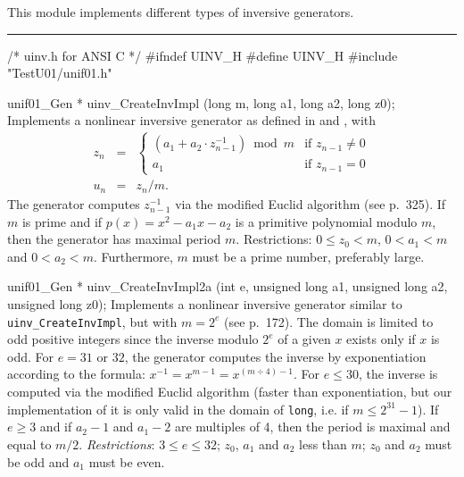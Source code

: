 
This module implements different types of inversive generators.

\bigskip
\hrule
\code
\hide
/* uinv.h for ANSI C */
#ifndef UINV_H
#define UINV_H
\endhide
#include "TestU01/unif01.h"


unif01_Gen * uinv_CreateInvImpl (long m, long a1, long a2, long z0);
\endcode
  \tab Implements a nonlinear inversive generator as 
   defined in \cite{rEIC92c} and \cite[p.93]{rLEC90a}, with
  \begin{eqnarray*}
         z_n &=& \left\{ \begin{array}{ll}
      (a_1 + a_2\cdot z_{n-1}^{-1})\bmod m & \mbox{if $z_{n-1}\not=0$}\\[6pt] 
       a_1                                       & \mbox{if $z_{n-1} = 0$} 
    \end{array} \right.\\
   u_n &=& z_n / m.
  \end{eqnarray*}
   The generator computes $z_{n-1}^{-1}$ via the modified
%
   Euclid algorithm (see \cite{rKNU81a} p.~325).  
   If $m$ is prime and if $p(x) = x^2 - a_1 x - a_2$ is a
   primitive polynomial modulo $m$, then the generator has 
    maximal  period $m$.
   Restrictions: $0 \le z_0 < m$,
   $0 < a_1 < m$ and $0 < a_2 < m$.  Furthermore, $m$ must be a prime
   number, preferably large. %
  \endtab
\code


unif01_Gen * uinv_CreateInvImpl2a (int e, unsigned long a1,
                                   unsigned long a2, unsigned long z0);
\endcode
  \tab Implements a nonlinear inversive generator similar to
    {\tt uinv\_CreateInvImpl}, but with $m = 2^e$ 
   (see \cite{rEIC92c} p.~172). 
   The  domain is limited to odd positive integers since 
   the inverse modulo $2^e$ of a given $x$ exists only if $x$ is odd.
   For $e = 31$ or $32$, the generator computes
   the inverse by exponentiation according to the formula:
   $x^{-1} = x^{m-1} = x^{(m \div 4) - 1}$.  
   For $e \le 30$, the inverse is computed via the modified
   Euclid algorithm (faster than exponentiation,
   but our implementation of it is only valid in the domain
   of {\tt long}, i.e. if $m \le 2^{31}-1$). 
   If $e\ge 3$ and if $a_2-1$ and $a_1-2$ are multiples of 4, 
   then the period is  maximal and equal to $m/2$.
   \emph{Restrictions}:  $3 \le e \le 32$; $z_0$, $a_1$ and $a_2$ less than
   $m$; $z_0$ and $a_2$ must be odd and $a_1$ must be even.
  \endtab
\code


